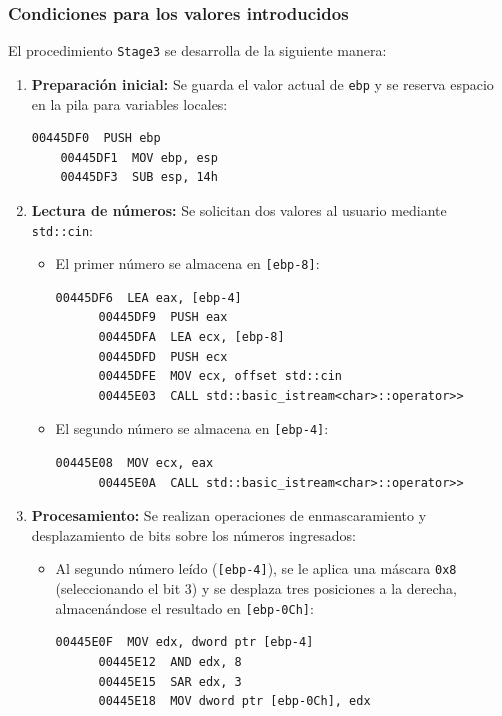 \documentclass[11pt,a4paper]{article}
\begin{document}
\subsubsection{Condiciones para los valores introducidos}
\noindent El procedimiento \texttt{Stage3} se desarrolla de la siguiente manera:
\begin{enumerate}
  \item \textbf{Preparación inicial:} Se guarda el valor actual de \texttt{ebp} y se reserva espacio en la pila para variables locales:\vspace{1ex}
  \begin{lstlisting}[style=assemblyStyle]
    00445DF0  PUSH ebp
    00445DF1  MOV ebp, esp
    00445DF3  SUB esp, 14h
  \end{lstlisting}
  \vspace{1ex}

  \item \textbf{Lectura de números:} Se solicitan dos valores al usuario mediante \texttt{std::cin}:
  \begin{itemize}
    \item El primer número se almacena en \texttt{[ebp-8]}: \vspace{1ex}
    \begin{lstlisting}[style=assemblyStyle]
      00445DF6  LEA eax, [ebp-4]
      00445DF9  PUSH eax
      00445DFA  LEA ecx, [ebp-8]
      00445DFD  PUSH ecx
      00445DFE  MOV ecx, offset std::cin
      00445E03  CALL std::basic_istream<char>::operator>>
    \end{lstlisting}
    \vspace{1ex}

    \item El segundo número se almacena en \texttt{[ebp-4]}: \vspace{1ex}
    \begin{lstlisting}[style=assemblyStyle]
      00445E08  MOV ecx, eax
      00445E0A  CALL std::basic_istream<char>::operator>>
    \end{lstlisting}
  \end{itemize}
  \vspace{1ex}

  \item \textbf{Procesamiento:} Se realizan operaciones de enmascaramiento y desplazamiento de bits sobre los números ingresados:
  \begin{itemize}
    \item Al segundo número leído (\texttt{[ebp-4]}), se le aplica una máscara \texttt{0x8} (seleccionando el bit 3) y se desplaza tres posiciones a la derecha, almacenándose el resultado en \texttt{[ebp-0Ch]}: \vspace{1ex}
    \begin{lstlisting}[style=assemblyStyle]
      00445E0F  MOV edx, dword ptr [ebp-4]
      00445E12  AND edx, 8
      00445E15  SAR edx, 3
      00445E18  MOV dword ptr [ebp-0Ch], edx
    \end{lstlisting}
    \vspace{1ex}


\end{itemize}
\end{enumerate}
\end{document}

